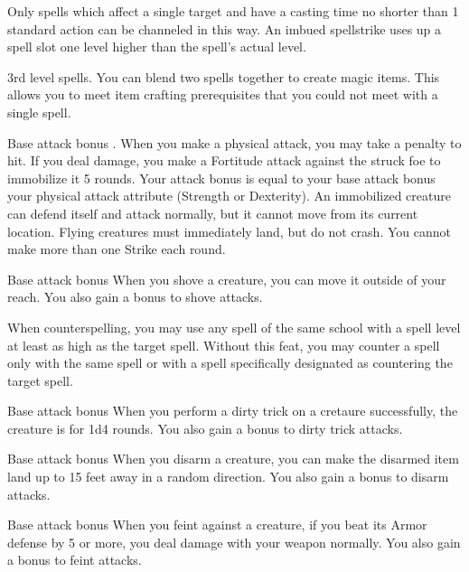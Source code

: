 Only spells which affect a single target and have a casting time no shorter than 1 standard action can be channeled in this way. An imbued spellstrike uses up a spell slot one level higher than the spell's actual level.

 3rd level spells.
 You can blend two spells together to create magic items. This allows you to meet item crafting prerequisites that you could not meet with a single spell.

\featpre Base attack bonus .
\featben When you make a physical attack, you may take a  penalty to hit. If you deal damage, you make a Fortitude attack against the struck foe to immobilize it 5 rounds. Your attack bonus is equal to your base attack bonus \add your physical attack attribute (Strength or Dexterity). An immobilized creature can defend itself and attack normally, but it cannot move from its current location. Flying creatures must immediately land, but do not crash. You cannot make more than one Strike each round.

 Base attack bonus 
 When you shove a creature, you can move it outside of your reach. You also gain a  bonus to shove attacks.

 When counterspelling, you may use any spell of the same school with a spell level at least as high as the target spell.
 Without this feat, you may counter a spell only with the same spell or with a spell specifically designated as countering the target spell.

 Base attack bonus 
 When you perform a dirty trick on a cretaure successfully, the creature is \vulnerable for 1d4 rounds. You also gain a  bonus to dirty trick attacks.

 Base attack bonus 
 When you disarm a creature, you can make the disarmed item land up to 15 feet away in a random direction. You also gain a  bonus to disarm attacks.

 Base attack bonus 
 When you feint against a creature, if you beat its Armor defense by 5 or more, you deal damage with your weapon normally. You also gain a  bonus to feint attacks.

